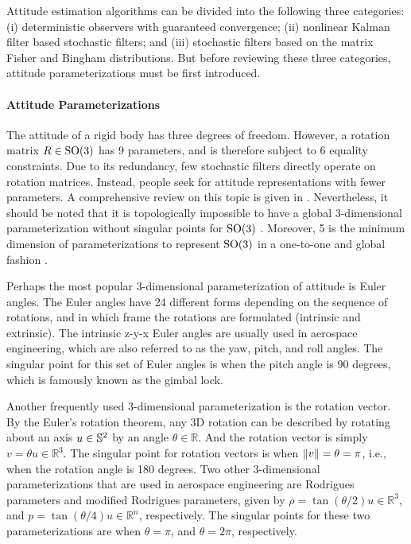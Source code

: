 Attitude estimation algorithms can be divided into the following three categories:
(i) deterministic observers with guaranteed convergence;
(ii) nonlinear Kalman filter based stochastic filters;
and (iii) stochastic filters based on the matrix Fisher and Bingham distributions.
But before reviewing these three categories, attitude parameterizations must be first introduced.

\paragraph{Attitude Parameterizations}

The attitude of a rigid body has three degrees of freedom.
However, a rotation matrix $R\in\mathrm{SO}(3)$ has 9 parameters, and is therefore subject to 6 equality constraints.
Due to its redundancy, few stochastic filters directly operate on rotation matrices.
Instead, people seek for attitude representations with fewer parameters.
A comprehensive review on this topic is given in \cite{shuster1993survey}.
Nevertheless, it should be noted that it is topologically impossible to have a global 3-dimensional parameterization without singular points for $\mathrm{SO}(3)$ \cite{stuelpnagel1964parametrization}.
Moreover, 5 is the minimum dimension of parameterizations to represent $\mathrm{SO}(3)$ in a one-to-one and global fashion \cite{stuelpnagel1964parametrization}.

Perhaps the most popular 3-dimensional parameterization of attitude is Euler angles.
The Euler angles have 24 different forms depending on the sequence of rotations, and in which frame the rotations are formulated (intrinsic and extrinsic).
The intrinsic z-y-x Euler angles are usually used in aerospace engineering, which are also referred to as the yaw, pitch, and roll angles.
The singular point for this set of Euler angles is when the pitch angle is 90 degrees, which is famously known as the gimbal lock.

Another frequently used 3-dimensional parameterization is the rotation vector.
By the Euler's rotation theorem, any 3D rotation can be described by rotating about an axis $u\in\mathbb{S}^2$ by an angle $\theta\in\mathbb{R}$.
And the rotation vector is simply $v = \theta u \in \mathbb{R}^3$.
The singular point for rotation vectors is when $\left\| v \right\| = \theta = \pi$, i.e., when the rotation angle is 180 degrees.
Two other 3-dimensional parameterizations that are used in aerospace engineering are Rodrigues parameters and modified Rodrigues parameters, given by $\rho = \tan(\theta/2) u \in \mathbb{R}^3$, and $p = \tan(\theta/4) u \in \mathbb{R}^n$, respectively.
The singular points for these two parameterizations are when $\theta = \pi$, and $\theta = 2\pi$, respectively.

